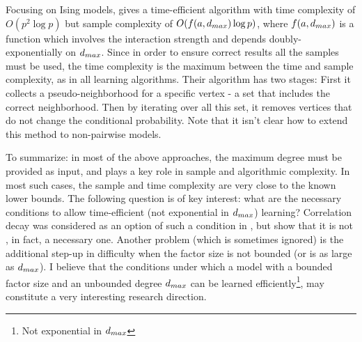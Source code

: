 Focusing on Ising models,  \cite{bresler2015efficiently} gives a time-efficient algorithm with time complexity of $O(p^2\log p)$ but sample complexity of $O( f(a,d_{max}) \log p)$, where $f(a,d_{max})$ is a function which involves the interaction strength and depends doubly-exponentially on $d_{max}$.
Since in order to ensure correct results all the samples must be used, the time complexity is the maximum between the time and sample complexity, as in all learning algorithms. 
Their algorithm has two stages: First it collects a pseudo-neighborhood for a specific vertex - a set that includes the correct neighborhood.
Then by iterating over all this set, it removes vertices that do not change the conditional probability.
Note that it isn't clear how to extend this method to non-pairwise models.

To summarize: in most of the above approaches, the maximum degree must be provided as input, and plays a key role in sample and algorithmic complexity.
In most such cases, the sample and time complexity are very close to the known lower bounds.
The following question is of key interest: what are the necessary conditions to allow time-efficient (not exponential in $d_{max}$) learning?
Correlation decay was considered as an option of such a condition in \cite{montanari2009graphical}, but \cite{bresler2014structure} show that it is not , in fact, a necessary one.
Another problem (which is sometimes ignored) is the additional step-up in difficulty when the factor size is not bounded (or is as large as $d_{max}$). 
I believe that the conditions under which a model with a bounded factor size and an unbounded degree $d_{max}$ can be learned efficiently\footnote{Not exponential in $d_{max}$}, may constitute a very interesting research direction.
